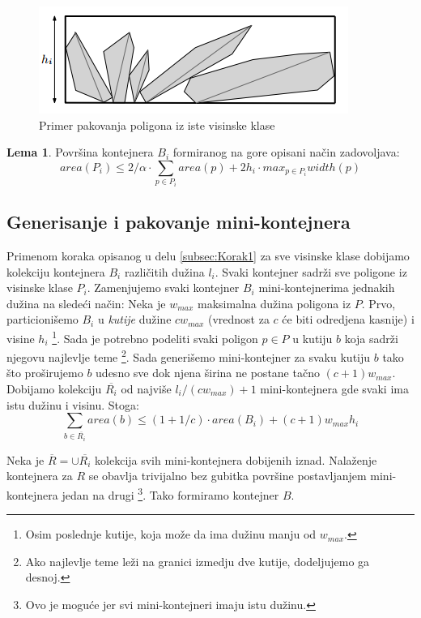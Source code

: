 \documentclass[a4paper]{article}
\theoremstyle{plain}
\theoremstyle{definition}
\newtheorem{lem}[thm]{Lema} %
\begin{document}
\begin{figure}[H]
    \centering
    \includegraphics[scale=0.8]{resources/fig1.PNG}
    \caption{Primer pakovanja poligona iz iste visinske klase}
    \label{fig1}
\end{figure}

\begin{lem}
    Povr\v{s}ina kontejnera $B_{i}$ formiranog na gore opisani na\v{c}in zadovoljava: $$area(P_{i}) \leq 2/\alpha \cdot \sum_{p \in P_{i}}{area(p) + 2h_{i} \cdot max_{p \in P_{i}}{width(p)}}$$
\end{lem}


\subsection{Generisanje i pakovanje mini-kontejnera}
\label{subsec:Korak2}

Primenom koraka opisanog u delu \ref{subsec:Korak1} za sve visinske klase dobijamo kolekciju kontejnera $B_{i}$ razli\v{c}itih du\v{z}ina $l_{i}$. Svaki kontejner sadr\v{z}i sve poligone iz visinske klase $P_{i}$. Zamenjujemo svaki kontejner $B_{i}$ mini-kontejnerima jednakih du\v{z}ina na slede\'c{}i na\v{c}in: Neka je $w_{max}$ maksimalna du\v{z}ina poligona iz $P$. Prvo, particioni\v{s}emo $B_{i}$ u \emph{kutije} du\v{z}ine $cw_{max}$ (vrednost za $c$ \'c{}e biti odredjena kasnije) i visine $h_{i}$ \footnote{Osim poslednje kutije, koja mo\v{z}e da ima du\v{z}inu manju od $w_{max}$.}. Sada je potrebno podeliti svaki poligon $p \in P$ u kutiju $b$ koja sadr\v{z}i njegovu najlevlje teme \footnote{Ako najlevlje teme le\v{z}i na granici izmedju dve kutije, dodeljujemo ga desnoj.}. Sada generi\v{s}emo mini-kontejner za svaku kutiju $b$ tako \v{s}to pro\v{s}irujemo $b$ udesno sve dok njena \v{s}irina ne postane ta\v{c}no $(c+1)w_{max}$. Dobijamo kolekciju $\overline{R_{i}}$ od najvi\v{s}e $l_{i}/(cw_{max}) + 1$ mini-kontejnera gde svaki ima istu du\v{z}inu i visinu. Stoga:
$$\sum_{b \in \overline{R_{i}}}{area(b)} \leq (1 + 1/c) \cdot area(B_{i}) + (c+1)w_{max}h_{i}$$

Neka je $\overline{R} = \cup{\overline{R_{i}}}$ kolekcija svih mini-kontejnera dobijenih iznad. Nala\v{z}enje kontejnera za $R$ se obavlja trivijalno bez gubitka povr\v{s}ine postavljanjem mini-kontejnera jedan na drugi \footnote{Ovo je mogu\'c{}e jer svi mini-kontejneri imaju istu du\v{z}inu.}. Tako formiramo kontejner $B$.
\end{document}
